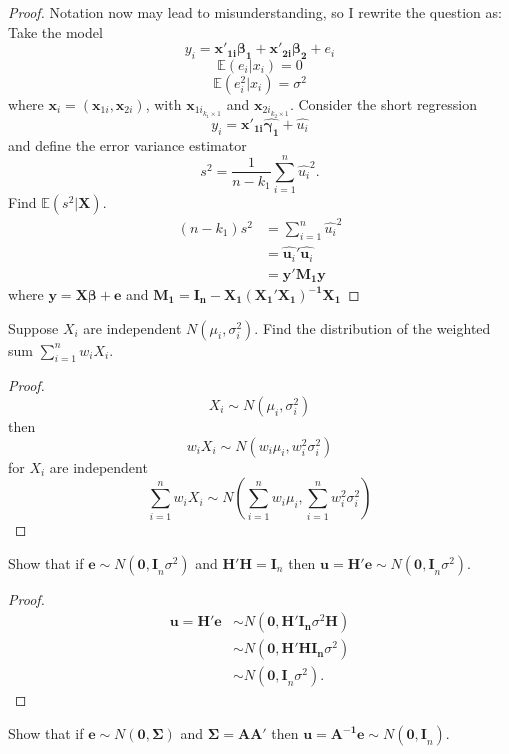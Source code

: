 \documentclass[12pt]{article}
\newenvironment{question}[2][Question]{\begin{trivlist}
\item[\hskip \labelsep {\bfseries #1}\hskip \labelsep {\bfseries #2.}]}{\end{trivlist}}
\begin{document}
\begin{proof}
Notation now may lead to misunderstanding, so I rewrite the question as:\\
Take the model $$y_i = \bm{x'_{1i}\beta_1}+\bm{x'_{2i}\beta_2}+e_i$$
$$\mathbb{E}(e_i|x_i) = 0$$
$$\mathbb{E}(e_i^2|x_i) = \sigma^2$$
where $\bm{x}_i = (\bm{x}_{1i},\bm{x}_{2i})$, with $\bm{x}_{1i}_{k_1\times1}$ and $\bm{x}_{2i}_{k_2\times1}$. Consider the short regression $$y_i = \bm{x'_{1i}\hat{\gamma_1}}+\hat{u_i}$$
and define the error variance estimator
$$s^2 = \frac{1}{n-k_1}\sum_{i=1}^{n}\hat{u_i}^2.$$
Find $\mathbb{E}(s^2|\bm{X})$.\\
\begin{align*}
(n-k_1)s^2 
&= \sum_{i=1}^{n}\hat{u_i}^2\\
&=\hat{\bm{u}_i}'\hat{\bm{u}_i}\\
&= \bm{y'M_1y}
\end{align*}
where $\bm{y} = \bm{X\beta+e}$ and $\bm{M_1 = I_n-X_1(X_1'X_1)^{-1}X_1}$
\end{proof}

\begin{question}{5.12}
Suppose $X_i$ are independent $N(\mu_i,\sigma_i^2)$. Find the distribution of the weighted sum $\sum_{i=1}^{n}w_i X_i$.
\end{question}

\begin{proof}
$$X_i \sim N(\mu_i,\sigma_i^2)$$
then
$$w_iX_i \sim N(w_i\mu_i,w_i^2\sigma_i^2)$$
for $X_i$ are independent
$$\sum_{i = 1}^{n}w_iX_i \sim N(\sum_{i = 1}^{n}w_i\mu_i,\sum_{i = 1}^{n}w_i^2\sigma_i^2)$$
\end{proof}

\begin{question}{5.13}
Show that if $\bm{e}\sim N(\bm{0,I}_n \sigma^2)$ and $\bm{H'H=I}_n$ then $\bm{u=H'e} \sim N(\bm{0, I}_n\sigma^2)$.
\end{question}

\begin{proof}
\begin{align*}
\bm{u=H'e} &\sim N(\bm{0},\bm{H'I_n}\sigma^2\bm{H}) \\
 &\sim N(\bm{0},\bm{H'HI_n}\sigma^2) \\
 &\sim N(\bm{0, I}_n\sigma^2).
\end{align*}
\end{proof}

\begin{question}{5.14}
Show that if $\bm{e} \sim N(\bm{0,\Sigma})$ and $\bm{\Sigma=AA'}$ then $\bm{u=A^{-1}e}\sim N(\bm{0,I}_n)$.
\end{question}
\end{document}
